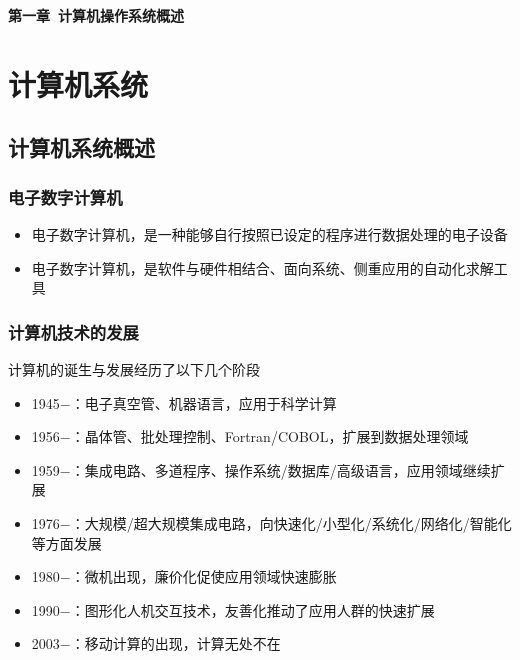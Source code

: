 \documentclass[cs4size,a4paper,10pt]{ctexart}
\begin{document}
	\begin{center}
		{\huge\textbf{第一章\ 计算机操作系统概述}}
	\end{center}
	\tableofcontents
	\clearpage

	\setcounter{page}{1}
	\setlength{\parskip}{0.65em}
	

	\section{计算机系统}
	\subsection{计算机系统概述}
	\subsubsection{电子数字计算机}
	\begin{itemize}
		\item 电子数字计算机，是一种能够自行按照已设定的程序进行数据处理的电子设备
		\item 电子数字计算机，是软件与硬件相结合、面向系统、侧重应用的自动化求解工具
	\end{itemize}


	\subsubsection{计算机技术的发展}
	计算机的诞生与发展经历了以下几个阶段
	\begin{itemize}
		\item 1945$-$：电子真空管、机器语言，应用于科学计算
		\item 1956$-$：晶体管、批处理控制、Fortran/COBOL，扩展到数据处理领域
		\item 1959$-$：集成电路、多道程序、操作系统/数据库/高级语言，应用领域继续扩展
		\item 1976$-$：大规模/超大规模集成电路，向快速化/小型化/系统化/网络化/智能化等方面发展
		\item 1980$-$：微机出现，廉价化促使应用领域快速膨胀
		\item 1990$-$：图形化人机交互技术，友善化推动了应用人群的快速扩展
		\item 2003$-$：移动计算的出现，计算无处不在
	\end{itemize}

	
\end{document}
